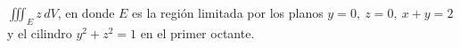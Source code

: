 \item $\iiint_E z \, dV$, en donde $E$ es la región limitada por los planos $y = 0, \ z = 0, \ x + y = 2$ y el cilindro $y^2 + z^2 = 1$ en el primer octante.
